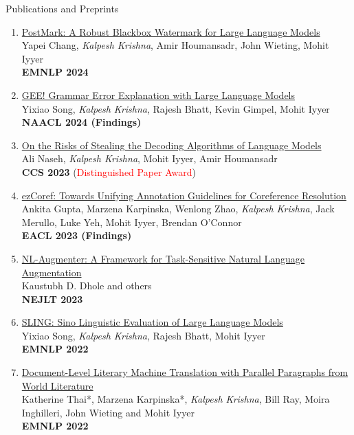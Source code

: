 \documentclass{resume} %
\begin{document}
\begin{rSection}{Publications and Preprints}
\begin{enumerate}[leftmargin=*]
\item \href{https://arxiv.org/abs/2406.14517}{PostMark: A Robust Blackbox Watermark for Large Language Models} \\
Yapei Chang, \emph{Kalpesh Krishna}, Amir Houmansadr, John Wieting, Mohit Iyyer \\
\textbf{EMNLP 2024}

\item \href{https://arxiv.org/abs/2311.09517}{GEE! Grammar Error Explanation with Large Language Models} \\
Yixiao Song, \emph{Kalpesh Krishna}, Rajesh Bhatt, Kevin Gimpel, Mohit Iyyer \\ \textbf{NAACL 2024 (Findings)}

\item \href{https://arxiv.org/abs/2303.04729}{On the Risks of Stealing the Decoding Algorithms of Language Models} \\
Ali Naseh, \emph{Kalpesh Krishna}, Mohit Iyyer, Amir Houmansadr \\
\textbf{CCS 2023} (\textcolor{red}{Distinguished Paper Award})


\item \href{https://arxiv.org/abs/2210.07188}{ezCoref: Towards Unifying Annotation Guidelines for Coreference Resolution} \\
Ankita Gupta, Marzena Karpinska, Wenlong Zhao, \emph{Kalpesh Krishna}, Jack Merullo, Luke Yeh, Mohit Iyyer, Brendan O'Connor \\
\textbf{EACL 2023 (Findings)}


\item \href{https://arxiv.org/abs/2112.02721}{NL-Augmenter: A Framework for Task-Sensitive Natural Language Augmentation} \\
Kaustubh D. Dhole and others \\
\textbf{NEJLT 2023}

\item \href{https://arxiv.org/abs/2210.11689}{SLING: Sino Linguistic Evaluation of Large Language Models} \\
Yixiao Song, \textit{Kalpesh Krishna}, Rajesh Bhatt, Mohit Iyyer \\
\textbf{EMNLP 2022}

\item \href{https://arxiv.org/abs/2210.14250}{Document-Level Literary Machine Translation with Parallel Paragraphs from World Literature} \\
Katherine Thai*, Marzena Karpinska*, \textit{Kalpesh Krishna}, Bill Ray, Moira Inghilleri, John Wieting and Mohit Iyyer \\
\textbf{EMNLP 2022}



\end{enumerate}
\end{rSection}
\end{document}
